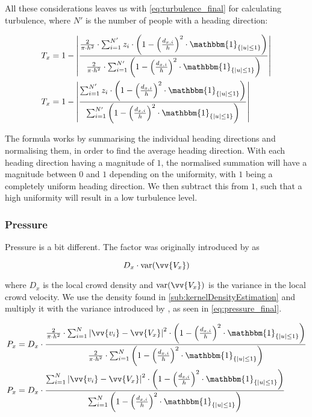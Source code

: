All these considerations leaves us with \cref{eq:turbulence_final} for calculating turbulence, where $N'$ is the number of people with a heading direction:

\begin{equation}
\label{eq:turbulence_final}
\begin{split}
T_x &= 1 - \left|\frac{\frac{2}{\pi \cdot h^2} \cdot \sum_{i=1}^{N'} z_i \cdot \left(1-\left(\frac{d_{x,i}}{h}\right)^2 \cdot \mathbbm{1}_{\{|u| \leq 1\} }\right)}{\frac{2}{\pi \cdot h^2} \cdot \sum_{i=1}^{N'} \left(1-\left(\frac{d_{x,i}}{h}\right)^2 \cdot \mathbbm{1}_{\{|u| \leq 1\} }\right)}\right| \\
%
%
T_x &= 1 - \left|\frac{\sum_{i=1}^{N'} z_i \cdot \left(1-\left(\frac{d_{x,i}}{h}\right)^2 \cdot \mathbbm{1}_{\{|u| \leq 1\} }\right)}{\sum_{i=1}^{N'} \left(1-\left(\frac{d_{x,i}}{h}\right)^2 \cdot \mathbbm{1}_{\{|u| \leq 1\} }\right)}\right|
\end{split}
\end{equation}

The formula works by summarising the individual heading directions and normalising them, in order to find the average heading direction. With each heading direction having a magnitude of $1$, the normalised summation will have a magnitude between $0$ and $1$ depending on the uniformity, with $1$ being a completely uniform heading direction. We then subtract this from $1$, such that a high uniformity will result in a low turbulence level.


\subsubsection{Pressure}
Pressure is a bit different. The factor was originally introduced by \citet{empircalstudy} as 

\begin{equation}
D_x \cdot \text{var}(\vv{V_x})
\end{equation}

where $D_x$ is the local crowd density and $\text{var}(\vv{V_x})$ is the variance in the local crowd velocity. We use the density found in \cref{sub:kernelDensityEstimation} and multiply it with the variance introduced by \citet{wirz2012inferring}, as seen in \cref{eq:pressure_final}.

\begin{equation}
\label{eq:pressure_final}
\begin{split}
P_x &= D_x \cdot \frac{\frac{2}{\pi \cdot h^2} \cdot \sum_{i=1}^{N} \left|\vv{v_i} - \vv{V_x}\right|^2 \cdot \left(1-\left(\frac{d_{x,i}}{h}\right)^2 \cdot \mathbbm{1}_{\{|u| \leq 1\} }\right)}{\frac{2}{\pi \cdot h^2} \cdot \sum_{i=1}^{N} \left(1-\left(\frac{d_{x,i}}{h}\right)^2 \cdot \mathbbm{1}_{\{|u| \leq 1\} }\right)}\\
%
%
P_x &= D_x \cdot \frac{\sum_{i=1}^{N} \left|\vv{v_i} - \vv{V_x}\right|^2 \cdot \left(1-\left(\frac{d_{x,i}}{h}\right)^2 \cdot \mathbbm{1}_{\{|u| \leq 1\} }\right)}{\sum_{i=1}^{N} \left(1-\left(\frac{d_{x,i}}{h}\right)^2 \cdot \mathbbm{1}_{\{|u| \leq 1\} }\right)}
\end{split}
\end{equation}

